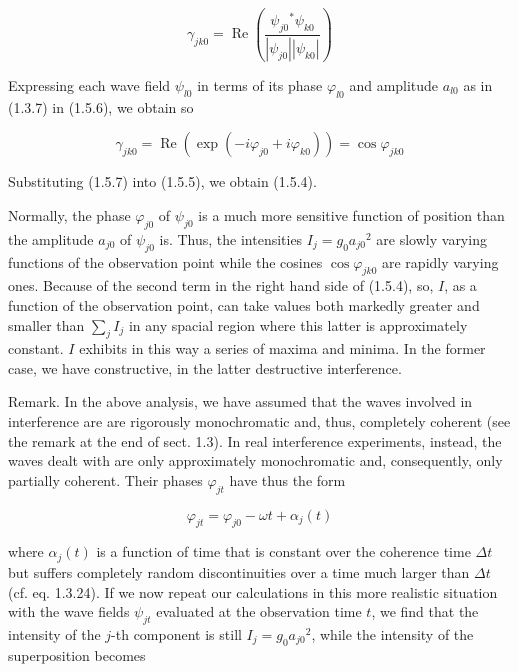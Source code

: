\documentclass{article}
\begin{document}
\begin{equation*}
\gamma_{j k 0}=\operatorname{Re}\left(\frac{\psi_{j 0}{ }^{*} \psi_{k 0}}{\left|\psi_{j 0}\right|\left|\psi_{k 0}\right|}\right) \tag{1.5.6}
\end{equation*}
 

Expressing each wave field $\psi_{l 0}$ in terms of its phase $\varphi_{l 0}$ and amplitude $a_{l 0}$ as in (1.3.7) in (1.5.6), we obtain so
 
\begin{equation*}
\gamma_{j k 0}=\operatorname{Re}\left(\exp \left(-i \varphi_{j 0}+i \varphi_{k 0}\right)\right)=\cos \varphi_{j k 0} \tag{1.5.7}
\end{equation*}
 

Substituting (1.5.7) into (1.5.5), we obtain (1.5.4).

Normally, the phase $\varphi_{j 0}$ of $\psi_{j 0}$ is a much more sensitive function of position than the amplitude $a_{j 0}$ of $\psi_{j 0}$ is. Thus, the intensities $I_{j}=g_{0} a_{j 0}{ }^{2}$ are slowly varying functions of the observation point while the cosines $\cos \varphi_{j k 0}$ are rapidly varying ones. Because of the second term in the right hand side of (1.5.4), so, $I$, as a function of the observation point, can take values both markedly greater and smaller than $\sum_{j} I_{j}$ in any spacial region where this latter is approximately constant. $I$ exhibits in this way a series of maxima and minima. In the former case, we have constructive, in the latter destructive interference.

Remark. In the above analysis, we have assumed that the waves involved in interference are are rigorously monochromatic and, thus, completely coherent (see the
remark at the end of sect. 1.3). In real interference experiments, instead, the waves dealt with are only approximately monochromatic and, consequently, only partially coherent. Their phases $\varphi_{j t}$ have thus the form
 
\begin{equation*}
\varphi_{j t}=\varphi_{j 0}-\omega t+\alpha_{j}(t) \tag{1.5.8}
\end{equation*}
 
where $\alpha_{j}(t)$ is a function of time that is constant over the coherence time $\Delta t$ but suffers completely random discontinuities over a time much larger than $\Delta t$ (cf. eq. 1.3.24). If we now repeat our calculations in this more realistic situation with the wave fields $\psi_{j t}$ evaluated at the observation time $t$, we find that the intensity of the $j$-th component is still $I_{j}=g_{0} a_{j 0}{ }^{2}$, while the intensity of the superposition becomes
 
\end{document}
